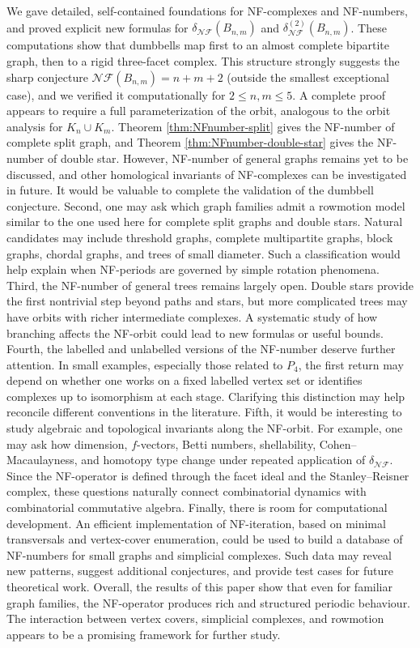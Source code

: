 \documentclass[12pt]{article}
\theoremstyle{plain}
\theoremstyle{definition}
\begin{document}
	We gave detailed, self-contained foundations for NF-complexes and NF-numbers, and proved explicit new formulas for
	$\delta_{\mathcal{NF}}(B_{n,m})$ and $\delta_{\mathcal{NF}}^{(2)}(B_{n,m})$. These computations show that dumbbells map first to an almost complete	bipartite graph, then to a rigid three-facet complex. This structure strongly suggests the sharp conjecture
	$\mathcal{NF}(B_{n,m})=n+m+2$ (outside the smallest exceptional case), and we verified it computationally for $2\le n,m\le 5$.
	A complete proof appears to require a full parameterization of the orbit, analogous to the orbit analysis for $K_n\cup K_m$. Theorem \ref{thm:NFnumber-split} gives the NF-number of complete split graph, and Theorem \ref{thm:NFnumber-double-star} gives the NF-number of double star. However, NF-number of general graphs remains yet to be discussed, and other homological invariants of NF-complexes can be investigated in future.  It would be valuable to complete the validation of the dumbbell conjecture.  Second, one may ask which graph families admit a rowmotion model similar to the one used here for complete split graphs and double stars. Natural candidates may include threshold graphs, complete multipartite graphs, block graphs, chordal graphs, and trees of small diameter. Such a classification would help explain when NF-periods are governed by simple rotation phenomena. Third, the NF-number of general trees remains largely open. Double stars provide the first nontrivial step beyond paths and stars, but more complicated trees may have orbits with richer intermediate complexes. A systematic study of how branching affects the NF-orbit could lead to new formulas or useful bounds. Fourth, the labelled and unlabelled versions of the NF-number deserve further attention. In small examples, especially those related to $P_4$, the first return may depend on whether one works on a fixed labelled vertex set or identifies complexes up to isomorphism at each stage. Clarifying this distinction may help reconcile different conventions in the literature. Fifth, it would be interesting to study algebraic and topological invariants along the NF-orbit. For example, one may ask how dimension, $f$-vectors, Betti numbers, shellability, Cohen--Macaulayness, and homotopy type change under repeated application of $\delta_{\mathcal{NF}}$. Since the NF-operator is defined through the facet ideal and the Stanley--Reisner complex, these questions naturally connect combinatorial dynamics with combinatorial commutative algebra.  Finally, there is room for computational development. An efficient implementation of NF-iteration, based on minimal transversals and vertex-cover enumeration, could be used to build a database of NF-numbers for small graphs and simplicial complexes. Such data may reveal new patterns, suggest additional conjectures, and provide test cases for future theoretical work.  Overall, the results of this paper show that even for familiar graph families, the NF-operator produces rich and structured periodic behaviour. The interaction between vertex covers, simplicial complexes, and rowmotion appears to be a promising framework for further study.
	
\end{document}
